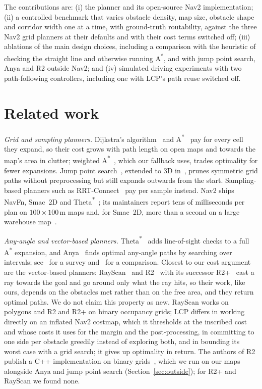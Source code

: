 \documentclass[conference]{IEEEtran}
\newcommand{\lcp}{LCP}
\begin{document}
The contributions are: (i) the planner and its open-source Nav2 implementation;
(ii) a controlled benchmark that varies obstacle density, map size, obstacle
shape and corridor width one at a time, with ground-truth routability, against
the three Nav2 grid planners at their defaults and with their cost terms switched
off; (iii) ablations of the main design choices, including a comparison with the
heuristic of checking the straight line and otherwise running
A\textsuperscript{*}, and with jump point search, Anya and R2 outside Nav2; and (iv)
simulated driving experiments with two path-following controllers, including one
with \lcp{}'s path reuse switched off.

\section{Related work}
\label{sec:related}

\emph{Grid and sampling planners.} Dijkstra's algorithm~\cite{dijkstra1959note}
and A\textsuperscript{*}~\cite{hart1968formal} pay for every cell they expand,
so their cost grows with path length on open maps and towards the map's area in
clutter; weighted A\textsuperscript{*}~\cite{pohl1970heuristic}, which our
fallback uses, trades optimality for fewer expansions. Jump point
search~\cite{harabor2011jps}, extended to 3D in~\cite{liu2017sfc}, prunes
symmetric grid paths without preprocessing but still expands outwards from the
start. Sampling-based planners such as RRT-Connect~\cite{kuffner2000rrt} pay per
sample instead. Nav2 ships NavFn, Smac~2D and
Theta\textsuperscript{*}~\cite{macenski2020marathon,macenski2023survey,macenski2024smac};
its maintainers report tens of milliseconds per plan on $100\times100$\,m maps
and, for Smac~2D, more than a second on a large warehouse map~\cite{macenski2024smac}.

\emph{Any-angle and vector-based planners.}
Theta\textsuperscript{*}~\cite{daniel2010theta} adds line-of-sight checks to a
full A\textsuperscript{*} expansion, and Anya~\cite{harabor2016anya} finds
optimal any-angle paths by searching over intervals; see~\cite{nash2013anyangle}
for a survey and~\cite{uras2015comparison} for a comparison. Closest to our
cost argument are the vector-based planners: RayScan~\cite{hechenberger2020rayscan}
and R2~\cite{lai2024r2} with its successor R2+~\cite{lai2024r2plus} cast a ray
towards the goal and go around only what the ray hits, so their work, like ours,
depends on the obstacles met rather than on the free area, and they return optimal
paths. We do not claim this property as new.
RayScan works on polygons and R2 and R2+ on binary occupancy grids; \lcp{} differs
in working directly on an inflated Nav2 costmap, which it thresholds at the
inscribed cost and whose costs it uses for the margin and the post-processing,
in committing to one side per
obstacle greedily instead of exploring both, and in bounding its worst case with
a grid search; it gives up optimality in return.
The authors of R2 publish a C++ implementation on binary grids~\cite{r2code}, which
we run on our maps alongside Anya and jump point search (Section~\ref{sec:outside});
for R2+ and RayScan we found none.
\end{document}
